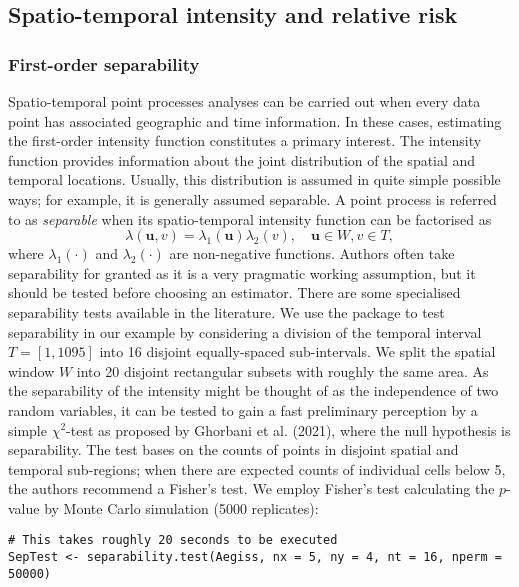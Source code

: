 \hypertarget{spatio-temporal-intensity-and-relative-risk}{%
\subsection{Spatio-temporal intensity and relative risk}\label{spatio-temporal-intensity-and-relative-risk}}

\hypertarget{first-order-separability}{%
\subsubsection{First-order separability}\label{first-order-separability}}

Spatio-temporal point processes analyses can be carried out when every data point has associated geographic and time information. In these cases, estimating the first-order intensity function constitutes a primary interest. The intensity function provides information about the joint distribution of the spatial and temporal locations. Usually, this distribution is assumed in quite simple possible ways; for example, it is generally assumed separable. A point process is referred to as \textit{separable} when its spatio-temporal intensity function can be factorised as
\[
    \lambda(\mathbf{u},v) = \lambda_1(\mathbf{u}) \lambda_2(v), \quad  \mathbf{u} \in W,v \in T,
\]
where
\(\lambda_1(\cdot)\) and \(\lambda_2(\cdot)\) are non-negative functions. Authors often take separability for granted as it is a very pragmatic working assumption, but it should be tested before choosing an estimator. There are some specialised separability tests available in the literature. We use the package  to test separability in our example by considering a division of the temporal interval \(T=[1,1095]\) into 16 disjoint equally-spaced sub-intervals. We split the spatial window \(W\) into 20 disjoint rectangular subsets with roughly the same area. As the separability of the intensity might be thought of as the independence of two random variables, it can be tested to gain a fast preliminary perception by a simple \(\chi^2\)-test as proposed by Ghorbani et al. (2021), where the null hypothesis is separability. The test bases on the counts of points in disjoint spatial and temporal sub-regions; when there are expected counts of individual cells below 5, the authors recommend a Fisher's test. We employ Fisher's test calculating the \(p\)-value by Monte Carlo simulation (5000 replicates):

\begin{verbatim}
# This takes roughly 20 seconds to be executed 
SepTest <- separability.test(Aegiss, nx = 5, ny = 4, nt = 16, nperm = 50000)
\end{verbatim}

